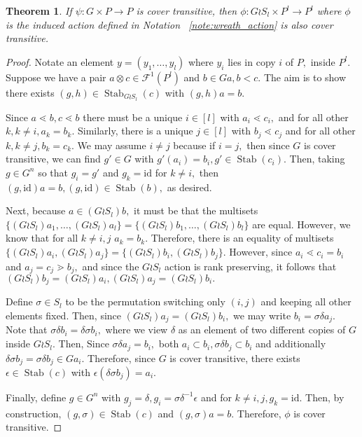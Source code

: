 \documentclass{amsart}
\newtheorem{thm}{Theorem}[subsection]
\theoremstyle{remark}
\newcommand{\id}{\mathrm{id}}
\def\Stab{\operatorname{Stab}}
\begin{document}
\begin{thm}
\label{thm:wreath_preservation}
If $\psi:G\times P \rightarrow P$ is cover transitive, then $\phi:G\wr S_l \times P^l \rightarrow P^l$ where $\phi$ is the induced action defined in Notation ~\ref{note:wreath_action} is also cover transitive.
\end{thm}
\begin{proof}

Notate an element $y = (y_1,\ldots, y_l)$ where $y_i$ lies in copy $i$ of $P,$ inside $P^l.$ Suppose we have a pair $a \otimes c \in \mathcal F^1(P^l)$ and $b \in Ga,b < c.$ The aim is to show there exists $(g,h) \in \Stab_{G\wr S_l}(c)$ with $(g,h)a = b.$ 

Since $a \lessdot b, c \lessdot b$  there must be a unique $i \in [l]$ with $a_i \lessdot c_i,$ and for all other $k,k\neq i,a_k = b_k.$ Similarly, there is a unique $j \in [l]$ with $b_j \lessdot c_j$ and for all other $k,k\neq j,b_k = c_k.$ We may assume $i \neq j$  because if $i = j,$ then since $G$ is cover transitive, we can find $g' \in G$ with $g'(a_i) = b_i,g' \in \Stab(c_i).$ Then, taking $g \in G^n$ so that $g_i = g'$ and $g_k = \id$ for $k \neq i,$ then $(g,\id)a = b,(g,\id) \in \Stab(b),$ as desired.

Next, because $a \in (G\wr S_l)b,$ it must be that the multisets $\{(G \wr S_l)a_1,\ldots, (G \wr S_l)a_l\}=\{(G \wr S_l)b_1,\ldots, (G \wr S_l)b_l\}$ are equal. However, we know that for all $k \neq i,j$ $a_k = b_k$. Therefore, there is an equality of multisets $\{(G \wr S_l)a_i,(G \wr S_l)a_j\} = \{(G \wr S_l)b_i,(G \wr S_l)b_j\}.$ However, since $a_i \lessdot c_i = b_i$ and $a_j = c_j \gtrdot b_j,$ and since the $G\wr S_l$ action is rank preserving, it follows that $(G \wr S_l)b_j=(G \wr S_l)a_i, (G \wr S_l)a_j = (G \wr S_l)b_i.$

Define $\sigma \in S_l$ to be the permutation switching only $(i,j)$ and keeping all other elements fixed. Then, since $(G \wr S_l)a_j = (G \wr S_l)b_i,$ we may write $b_i = \sigma\delta a_j.$ 
Note that $\sigma \delta b_i = \delta \sigma b_i,$ where we view $\delta$ as an element of two different copies of $G$ inside $G \wr S_l.$ Then,
Since $\sigma \delta a_j = b_i,$ both $a_i \subset b_i,\sigma \delta b_j \subset b_i$ and additionally $\delta\sigma b_j = \sigma\delta b_j \in Ga_i.$ Therefore, since $G$ is cover transitive, there exists $\epsilon \in \Stab(c)$ with $\epsilon(\delta\sigma b_j) = a_i.$

Finally, define $g \in G^n$ with $g_j = \delta,g_i = \sigma\delta^{-1}\epsilon$ and for $k \neq i,j,g_k = \id.$ Then, by construction, $(g,\sigma) \in \Stab (c)$ and $(g,\sigma)a = b.$ Therefore, $\phi$ is cover transitive.
\end{proof}
\end{document}
